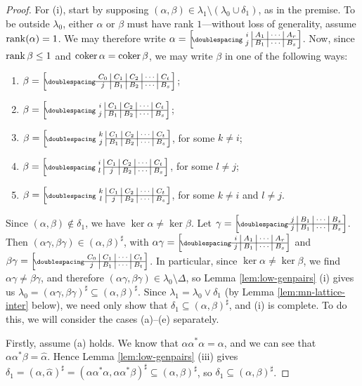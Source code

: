 \begin{lemma}
\begin{proof}
    For (i), start by supposing
    $(\alpha, \beta) \in \lambda_1 \setminus (\lambda_0 \cup \delta_1)$, as in
    the premise.  To be outside $\lambda_0$, either $\alpha$ or $\beta$ must
    have rank $1$---without loss of generality, assume $\operatorname{rank}(\alpha)=1$.  We
    may therefore write
    $\alpha=\bipart{c|c|c|c}{2-4}{i&A_1&\cdots&A_r}{j&B_1&\cdots&B_s}$.  Now,
    since $\operatorname{rank}\beta \leq 1$ and $\operatorname{coker}\alpha = \operatorname{coker}\beta$, we may write
    $\beta$ in one of the following ways:
    \begin{enumerate}[\rm(a)]
    \item $\beta = \bipart{c|c|c|c|c}{1-5}
      {C_0 & C_1 & C_2 & \cdots & C_t}{j & B_1 & B_2 & \cdots & B_s}$;
    \item $\beta = \bipart{c|c|c|c|c}{2-5}
      {i & C_1 & C_2 & \cdots & C_t}{j & B_1 & B_2 & \cdots & B_s}$;
    \item $\beta = \bipart{c|c|c|c|c}{2-5}
      {k & C_1 & C_2 & \cdots & C_t}{j & B_1 & B_2 & \cdots & B_s}$,
      for some $k \neq i$;
    \item $\beta = \bipart{c|c|c|c|c}{2-5}
      {i & C_1 & C_2 & \cdots & C_t}{l & j & B_2 & \cdots & B_s}$,
      for some $l \neq j$;
    \item $\beta = \bipart{c|c|c|c|c}{2-5}
      {k & C_1 & C_2 & \cdots & C_t}{l & j & B_2 & \cdots & B_s}$,
      for some $k \neq i$ and $l \neq j$.
    \end{enumerate}
    Since $(\alpha,\beta) \notin \delta_1$, we have
    $\ker\alpha \neq \ker\beta$.  Let
    $\gamma = \bipart{c|c|c|c}{1-4}
    {j & B_1 & \cdots & B_s}{j & B_1 & \cdots & B_s}$.  Then
    $(\alpha\gamma, \beta\gamma) \in (\alpha,\beta)^\sharp$, with
    $\alpha\gamma = \bipart{c|c|c|c}{1-4}
    {i & A_1 & \cdots & A_r}{j & B_1 & \cdots & B_s}$ and
    $\beta\gamma = \bipart{c|c|c|c}{1-4}
    {C_0 & C_1 & \cdots & C_t}{j & B_1 & \cdots & B_t}$.  In particular,
    since $\ker\alpha \neq \ker\beta$, we find $\alpha\gamma \neq \beta\gamma$,
    and therefore $(\alpha\gamma, \beta\gamma) \in \lambda_0 \setminus \Delta$,
    so Lemma \ref{lem:low-genpairs} (i) gives us
    $\lambda_0=(\alpha\gamma, \beta\gamma)^\sharp
    \subseteq (\alpha, \beta)^\sharp$.
    Since $\lambda_1 = \lambda_0 \vee \delta_1$ (by Lemma
    \ref{lem:mn-lattice-inter} below), we need only show that $\delta_1
    \subseteq (\alpha,\beta)^\sharp$, and (i) is complete.
    To do this, we will consider the cases (a)--(e) separately.

    Firstly, assume (a) holds.  We know that $\alpha \alpha^* \alpha = \alpha$,
    and we can see that $\alpha\alpha^*\beta = \widehat\alpha$.  Hence Lemma
    \ref{lem:low-genpairs} (iii) gives
    $\delta_1 = (\alpha, \widehat\alpha)^\sharp = (\alpha\alpha^*\alpha,
    \alpha\alpha^*\beta)^\sharp \subseteq (\alpha,\beta)^\sharp$, so
    $\delta_1 \subseteq (\alpha, \beta)^\sharp$.


\end{proof}
\end{lemma}
